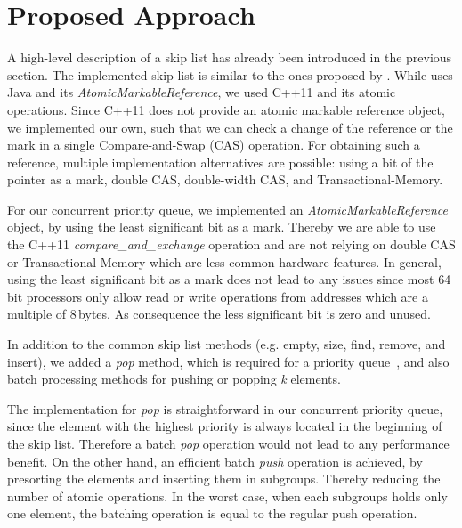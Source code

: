 \section{Proposed Approach}\label{sec:approach}
A high-level description of a skip list has already been introduced in the previous section. The implemented skip list is similar to the ones proposed by \cite{Herlihy:2008:AMP:1734069, Sundell:2005:FLC:1073765.1073770}. While \cite{Herlihy:2008:AMP:1734069} uses Java and its \textit{AtomicMarkableReference}, we used C++11 and its atomic operations. Since C++11 does not provide an atomic markable reference object, we implemented our own, such that we can check a change of the reference or the mark in a single Compare-and-Swap (CAS) operation. For obtaining such a reference, multiple implementation alternatives are possible: using a bit of the pointer as a mark, double CAS, double-width CAS, and Transactional-Memory.

For our concurrent priority queue, we implemented an \textit{AtomicMarkableReference} object, by using the least significant bit as a mark. Thereby we are able to use the C++11 {\em compare\_and\_exchange} operation and are not relying on double CAS or Transactional-Memory which are less common hardware features.
In general, using the least significant bit as a mark does not lead to any issues since most 64\,bit processors only allow read or write operations from addresses which are a multiple of 8\,bytes.
As consequence the less significant bit is zero and unused.

In addition to the common skip list methods (e.g. empty, size, find, remove, and insert), we added a \textit{pop} method, which is required for a priority queue~\cite{Herlihy:2008:AMP:1734069}, and also batch processing methods for pushing or popping \textit{k} elements.

The implementation for \textit{pop} is straightforward in our concurrent priority queue, since the element with the highest priority is always located in the beginning of the skip list.
Therefore a batch \textit{pop} operation would not lead to any performance benefit.
On the other hand, an efficient batch \textit{push} operation is achieved, by presorting the elements and inserting them in subgroups. Thereby reducing the number of atomic operations. In the worst case, when each subgroups holds only one element, the batching operation is equal to the regular push operation.


